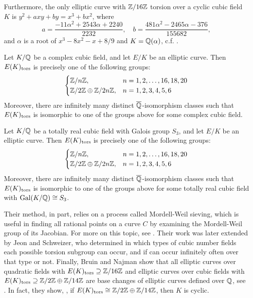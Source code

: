 Furthermore, the only elliptic curve with $\mathbb{Z}/16\mathbb{Z}$ torsion over a cyclic cubic field $K$ is $y^2 + a xy + by= x^3 + bx^2$, where
	\[
	a= \dfrac{-11\alpha^2 + 2543\alpha + 2240}{2232}, \quad b= \dfrac{481\alpha^2 - 2465\alpha - 376}{155682},
	\]
and $\alpha$ is a root of $x^3 - 8x^2 - x + 8/9$ and $K= \mathbb{Q}(\alpha)$, c.f. \cite[Lemma~4.13]{derickxnajman19}. 


\begin{thm}
Let $K/\mathbb{Q}$ be a complex cubic field, and let $E/K$ be an elliptic curve. Then $E(K)_{\text{tors}}$ is precisely one of the following groups:
	\[
	\begin{cases}
	\mathbb{Z}/n\mathbb{Z}, & n= 1, 2, \ldots, 16, 18, 20 \\
	\mathbb{Z}/2\mathbb{Z} \oplus \mathbb{Z}/2n\mathbb{Z}, & n= 1, 2, 3, 4, 5, 6
	\end{cases}
	\]
Moreover, there are infinitely many distinct $\overline{\mathbb{Q}}$-isomorphism classes such that $E(K)_{\text{tors}}$ is isomorphic to one of the groups above for some complex cubic field.
\end{thm}


\begin{thm}
Let $K/\mathbb{Q}$ be a totally real cubic field with Galois group $S_3$, and let $E/K$ be an elliptic curve. Then $E(K)_{\text{tors}}$ is precisely one of the following groups:
	\[
	\begin{cases}
	\mathbb{Z}/n\mathbb{Z}, & n= 1, 2, \ldots, 16, 18, 20 \\
	\mathbb{Z}/2\mathbb{Z} \oplus \mathbb{Z}/2n\mathbb{Z}, & n= 1, 2, 3, 4, 5, 6
	\end{cases}
	\]
Moreover, there are infinitely many distinct $\overline{\mathbb{Q}}$-isomorphism classes such that $E(K)_{\text{tors}}$ is isomorphic to one of the groups above for some totally real cubic field with $\operatorname{Gal}(K/\mathbb{Q}) \cong S_3$. 
\end{thm}


Their method, in part, relies on a process called Mordell-Weil sieving, which is useful in finding all rational points on a curve $C$ by examining the Mordell-Weil group of its Jacobian. For more on this topic, see \cite{bruinstoll10}. Their work was later extended by Jeon and Schweizer, who determined in \cite{jeonschweizer20} which types of cubic number fields each possible torsion subgroup can occur, and if can occur infinitely often over that type or not. Finally, Bruin and Najman show that all elliptic curves over quadratic fields with $E(K)_{\text{tors}} \supseteq \mathbb{Z}/16\mathbb{Z}$ and elliptic curves over cubic fields with $E(K)_{\text{tors}} \supseteq \mathbb{Z}/2\mathbb{Z} \oplus \mathbb{Z}/14\mathbb{Z}$ are base changes of elliptic curves defined over $\mathbb{Q}$, see \cite{bruinnajman17}. In fact, they show, \cite[Thm.~1.2]{bruinnajman17}, if $E(K)_{\text{tors}} \cong \mathbb{Z}/2\mathbb{Z} \oplus \mathbb{Z}/14\mathbb{Z}$, then $K$ is cyclic.


